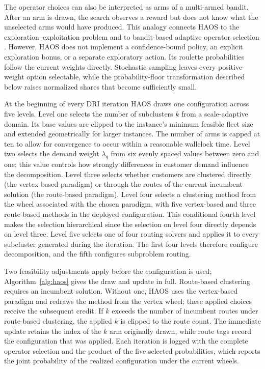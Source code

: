 The operator choices can also be interpreted as arms of a multi-armed bandit. After an arm is drawn, the search observes a reward but does not know what the unselected arms would have produced. This analogy connects HAOS to the exploration--exploitation problem \citep{auerFinitetimeAnalysisMultiarmed2002} and to bandit-based adaptive operator selection \citep{fialhoAnalyzingBanditbasedAdaptive2010}. However, HAOS does not implement a confidence-bound policy, an explicit exploration bonus, or a separate exploratory action. Its roulette probabilities follow the current weights directly. Stochastic sampling leaves every positive-weight option selectable, while the probability-floor transformation described below raises normalized shares that become sufficiently small.

At the beginning of every DRI iteration HAOS draws one configuration across five levels. Level one selects the number of subclusters $k$ from a scale-adaptive domain. Its base values are clipped to the instance's minimum feasible fleet size and extended geometrically for larger instances. The number of arms is capped at ten to allow for convergence to occur within a reasonable wallclock time. Level two selects the demand weight $\lambda_q$ from six evenly spaced values between zero and one; this value controls how strongly differences in customer demand influence the decomposition. Level three selects whether customers are clustered directly (the vertex-based paradigm) or through the routes of the current incumbent solution (the route-based paradigm). Level four selects a clustering method from the wheel associated with the chosen paradigm, with five vertex-based and three route-based methods in the deployed configuration. This conditional fourth level makes the selection hierarchical since the selection on level four directly depends on level three. Level five selects one of four routing solvers and applies it to every subcluster generated during the iteration. The first four levels therefore configure decomposition, and the fifth configures subproblem routing.

Two feasibility adjustments apply before the configuration is used; Algorithm~\ref{alg:haos} gives the draw and update in full. Route-based clustering requires an incumbent solution. Without one, HAOS uses the vertex-based paradigm and redraws the method from the vertex wheel; these applied choices receive the subsequent credit. If $k$ exceeds the number of incumbent routes under route-based clustering, the applied $k$ is clipped to the route count. The immediate update retains the index of the $k$ arm originally drawn, while route tags record the configuration that was applied. Each iteration is logged with the complete operator selection and the product of the five selected probabilities, which reports the joint probability of the realized configuration under the current wheels.

